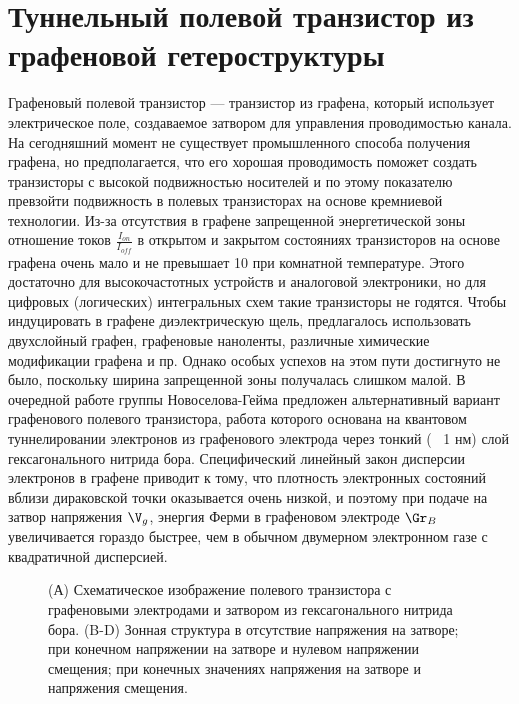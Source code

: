 \documentclass[a4paper,12pt]{article} %
\begin{document}
\section{Туннельный полевой транзистор из графеновой гетероструктуры}
\noindent Графеновый полевой транзистор — транзистор из графена, который использует электрическое поле, создаваемое затвором для управления проводимостью канала. На сегодняшний момент не существует промышленного способа получения графена, но предполагается, что его хорошая проводимость поможет создать транзисторы с высокой подвижностью носителей и по этому показателю превзойти подвижность в полевых транзисторах на основе кремниевой технологии.
\medskip
\noindent Из-за отсутствия в графене запрещенной энергетической зоны отношение токов $\frac{I_{on}}{I_{off}}$ в открытом и закрытом состояниях транзисторов на основе графена очень мало и не превышает 10 при комнатной температуре. Этого достаточно для высокочастотных устройств и аналоговой электроники, но для цифровых (логических) интегральных схем такие транзисторы не годятся. Чтобы индуцировать в графене диэлектрическую щель, предлагалось использовать двухслойный графен, графеновые наноленты, различные химические модификации графена и пр. Однако особых успехов на этом пути достигнуто не было, поскольку ширина запрещенной зоны получалась слишком малой. В очередной работе группы Новоселова-Гейма предложен альтернативный вариант графенового полевого транзистора, работа которого основана на квантовом туннелировании электронов из графенового электрода через тонкий (~ 1 нм) слой гексагонального нитрида бора. Специфический линейный закон дисперсии электронов в графене приводит к тому, что плотность электронных состояний вблизи дираковской точки оказывается очень низкой, и поэтому при подаче на затвор напряжения $\V_g$, энергия Ферми в графеновом электроде $\Gr_B$ увеличивается гораздо быстрее, чем в обычном двумерном электронном газе с квадратичной дисперсией.
\begin{figure}[h!]
\caption{(А) Схематическое изображение полевого транзистора
 с графеновыми электродами и затвором из гексагонального нитрида бора.
(B-D) Зонная структура в отсутствие напряжения на затворе;
при конечном напряжении на затворе и нулевом напряжении смещения;
при конечных значениях напряжения на затворе и напряжения смещения.}
\end{figure}
\end{document}
